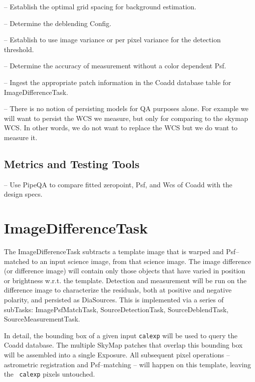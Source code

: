 \documentclass[prd, nofootinbib, floatfix, 11pt,tightenlines,times]{article}
\begin{document}
-- Establish the optimal grid spacing for background estimation.

-- Determine the deblending Config.

-- Establish to use image variance or per pixel variance for the detection threshold.

-- Determine the accuracy of measurement without a color dependent Psf.

-- Ingest the appropriate patch information in the Coadd database table for ImageDifferenceTask.

-- There is no notion of persisting models for QA purposes alone.  For example we will want to persist
the WCS we measure, but only for comparing to the skymap WCS.  In other words, we do not want to replace the 
WCS but we do want to measure it.  

\subsection{Metrics and Testing Tools}

-- Use PipeQA to compare fitted zeropoint, Psf, and Wcs of Coadd with the design specs.


\section{ImageDifferenceTask \label{sec-imagedifftask}} 



The ImageDifferenceTask subtracts a template image that is warped and
Psf--matched to an input science image, from that science image.  The
image difference (or difference image) will contain only those objects
that have varied in position or brightness w.r.t. the template.
Detection and measurement will be run on the difference image to
characterize the residuals, both at positive and negative polarity,
and persisted as DiaSources.  This is implemented via a series of
subTasks: ImagePsfMatchTask, SourceDetectionTask, SourceDeblendTask,
SourceMeasurementTask.

In detail, the bounding box of a given input {\tt calexp} will be used
to query the Coadd database.  The multiple SkyMap patches that overlap
this bounding box will be assembled into a single Exposure.  All
subsequent pixel operations -- astrometric registration and
Psf--matching -- will happen on this template, leaving the {\tt
  calexp} pixels untouched.
\end{document}
